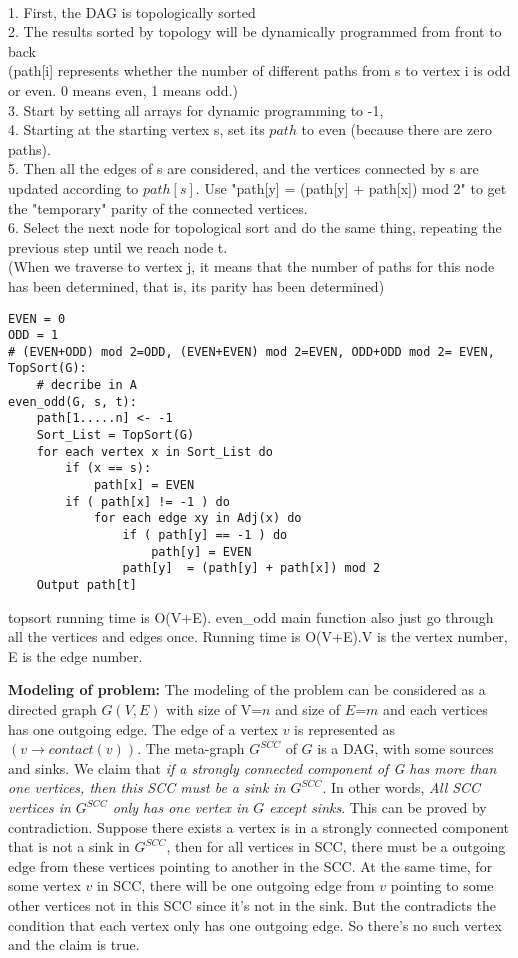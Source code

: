 \documentclass[12pt,a4paper]{article}
\newcommand{\question}[1]{\bigskip\noindent{\textbf{Q{#1} solution}}}
\begin{document}
\question{23.D}\\
1. First, the DAG is topologically sorted
\\2. The results sorted by topology will be dynamically programmed from front to back
\\(path[i] represents whether the number of different paths from s to vertex i is odd or even. 0 means even, 1 means odd.)
\\3. Start by setting all arrays for dynamic programming to -1,
\\4. Starting at the starting vertex s, set its $path$ to even (because there are zero paths).
\\5. Then all the edges of s are considered, and the vertices connected by s are updated according to $path[s]$. Use "path[y] = (path[y] + path[x]) mod 2" to get the "temporary" parity of the connected vertices.
\\6. Select the next node for topological sort and do the same thing, repeating the previous step until we reach node t.
\\(When we traverse to vertex j, it means that the number of paths for this node has been determined, that is, its parity has been determined)
\begin{lstlisting}
EVEN = 0 
ODD = 1
# (EVEN+ODD) mod 2=ODD, (EVEN+EVEN) mod 2=EVEN, ODD+ODD mod 2= EVEN, 
TopSort(G):
	# decribe in A
even_odd(G, s, t):
	path[1.....n] <- -1
	Sort_List = TopSort(G)
	for each vertex x in Sort_List do
		if (x == s):
			path[x] = EVEN
		if ( path[x] != -1 ) do
			for each edge xy in Adj(x) do
				if ( path[y] == -1 ) do
					path[y] = EVEN
				path[y]  = (path[y] + path[x]) mod 2
	Output path[t]
\end{lstlisting}
topsort running time is O(V+E). even\_odd main function also just go through all the vertices and edges once. Running time is O(V+E).V is the vertex number, E is the edge number.\\
\question{24.A}

{\bf Modeling of problem:} The modeling of the problem can be considered as a directed graph $G(V,E)$ with size of V=$n$ and size of $E$=$m$ and each vertices has one outgoing edge. The edge of a vertex $v$ is represented as $(v \rightarrow contact(v))$. The meta-graph $G^{SCC}$ of $G$ is a DAG, with some sources and sinks. We claim that {\em if a strongly connected component of G has more than one vertices, then this SCC must be a sink in $G^{SCC}$}. In other words, {\em All SCC vertices in $G^{SCC}$ only has one vertex in $G$ except sinks}. This can be proved by contradiction. Suppose there exists a vertex is in a strongly connected component that is not a sink in $G^{SCC}$, then for all vertices in SCC, there must be a outgoing edge from these vertices pointing to another in the SCC. At the same time, for some vertex $v$ in SCC, there will be one outgoing edge from $v$ pointing to some other vertices not in this SCC since it's not in the sink. But the contradicts the condition that each vertex only has one outgoing edge. So there's no such vertex and the claim is true.
\end{document}
